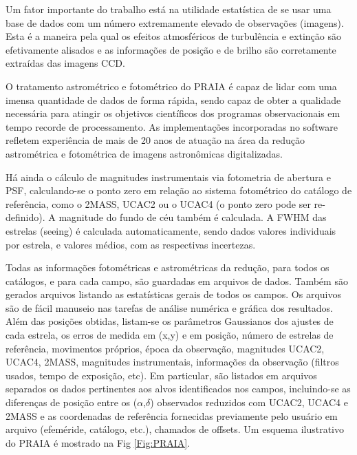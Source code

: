 \documentclass[12pt,a4paper]{monografia}
\begin{document}
Um fator importante do trabalho está na utilidade estatística de se usar uma base de dados com um número extremamente elevado de observações (imagens). Esta é a maneira pela qual os efeitos atmosféricos de turbulência e extinção são efetivamente alisados e as informações de posição e de brilho são corretamente extraídas das imagens CCD.

O tratamento astrométrico e fotométrico do PRAIA é capaz de lidar com uma imensa quantidade de dados de forma rápida, sendo capaz de obter a qualidade necessária para atingir os objetivos científicos dos programas observacionais em tempo recorde de processamento. As implementações incorporadas no software refletem experiência de mais de 20 anos de atuação na área da redução astrométrica e fotométrica de imagens astronômicas digitalizadas.

Há ainda o cálculo de magnitudes instrumentais via fotometria de abertura e PSF, calculando-se o ponto zero em relação ao sistema fotométrico do catálogo de referência, como o 2MASS, UCAC2 ou o UCAC4 (o ponto zero pode ser re-definido). A magnitude do fundo de céu também é calculada. A FWHM das estrelas (seeing) é calculada automaticamente, sendo dados valores individuais por estrela, e valores médios, com as respectivas incertezas.

Todas as informações fotométricas e astrométricas da redução, para todos os catálogos, e para cada campo, são guardadas em arquivos de dados. Também são gerados arquivos listando as estatísticas gerais de todos os campos. Os arquivos são de fácil manuseio nas tarefas de análise numérica e gráfica dos resultados. Além das posições obtidas, listam-se os parâmetros Gaussianos dos ajustes de cada estrela, os erros de medida em (x,y) e em posição, número de estrelas de referência, movimentos próprios, época da observação, magnitudes UCAC2, UCAC4, 2MASS, magnitudes instrumentais, informações da observação (filtros usados, tempo de exposição, etc). Em particular, são listados em arquivos separados os dados pertinentes aos alvos identificados nos campos, incluindo-se as diferenças de posição entre os ($ \alpha $,$ \delta $) observados reduzidos com UCAC2, UCAC4 e 2MASS e as coordenadas de referência fornecidas previamente pelo usuário em arquivo (efeméride, catálogo, etc.), chamados de offsets. Um esquema ilustrativo do PRAIA é mostrado na Fig \ref{Fig:PRAIA}.
\end{document}
